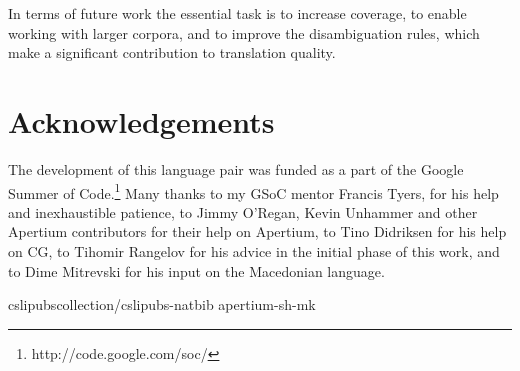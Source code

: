 \documentclass{book}
\begin{document}
In terms of future work the essential task is to increase coverage, to enable working
with larger corpora, and to improve the disambiguation rules, which make a significant
contribution to translation quality.

\section*{Acknowledgements}
The development of this language pair was funded as a part of the 
Google Summer of Code.\footnote{http://code.google.com/soc/}
Many thanks to my GSoC mentor Francis Tyers, for his help and inexhaustible
patience, to Jimmy O'Regan, Kevin Unhammer and other Apertium contributors for
their help on Apertium, to Tino Didriksen for his help on CG, to Tihomir Rangelov
for his advice in the initial phase of this work, and to Dime Mitrevski
for his input on the Macedonian language.

 {cslipubscollection/cslipubs-natbib}
 {apertium-sh-mk}

\backmatter
\end{document}
